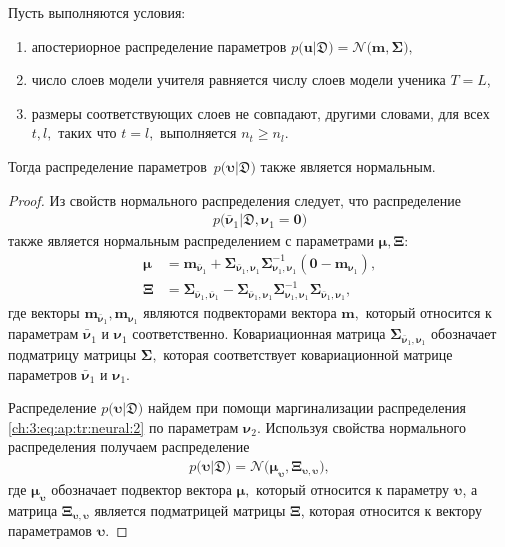 \begin{theorem}
\label{theorem:ap:neural}
Пусть выполняются условия:
\begin{enumerate}[1)]
\item апостериорное распределение параметров $p\bigr(\mathbf{u}|\mathfrak{D}\bigr) = \mathcal{N}\bigr(\mathbf{m}, \bm{\Sigma}\bigr),$
\item число слоев модели учителя равняется числу слоев модели ученика $T=L$,
\item размеры соответствующих слоев не совпадают, другими словами, для всех $t, l,$ таких что $t=l,$ выполняется $n_t \geq n_l.$
\end{enumerate}
Тогда распределение параметров~$p\bigr(\bm{\upsilon}|\mathfrak{D}\bigr)$ также является нормальным.
\end{theorem}
\begin{proof}
Из свойств нормального распределения следует, что распределение
\[
\label{ch:3:eq:ap:tr:neural:2}
\begin{aligned}
p\bigr(\bar{\bm{\nu}}_1|\mathfrak{D}, \bm{\nu}_1=\mathbf{0}\bigr)
\end{aligned}
\]
также является нормальным распределением с параметрами $\bm{\mu}, \bm{\Xi}$:
\[
\label{ch:3:eq:ap:tr:1:1}
\begin{aligned}
\bm{\mu} &= \mathbf{m}_{\bar{\bm{\nu}}_1}+\bm{\Sigma}_{\bar{\bm{\nu}}_1,\bm{\nu}_1} \bm{\Sigma}_{\bm{\nu}_1,\bm{\nu}_1}^{-1} \left(\mathbf{0} - \mathbf{m}_{\bm{\nu}_1}\right), \\
 \bm{\Xi} &= \bm{\Sigma}_{\bar{\bm{\nu}}_1,\bar{\bm{\nu}}_1} - \bm{\Sigma}_{\bar{\bm{\nu}}_1,\bm{\nu}_1} \bm{\Sigma}_{\bm{\nu}_1,\bm{\nu}_1}^{-1} \bm{\Sigma}_{\bar{\bm{\nu}}_1,\bm{\nu}_1},
\end{aligned}
\]
где векторы $\mathbf{m}_{\bar{\bm{\nu}}_1}, \mathbf{m}_{\bm{\nu}_1}$ являются подвекторами вектора $\mathbf{m},$ который относится к параметрам $\bar{\bm{\nu}}_1$ и $\bm{\nu}_1$ соответственно. Ковариационная матрица $\bm{\Sigma}_{\bar{\bm{\nu}}_1,\bm{\nu}_1}$ обозначает подматрицу матрицы $\bm{\Sigma},$ которая соответствует ковариационной матрице параметров $\bar{\bm{\nu}}_1$ и $\bm{\nu}_1.$

Распределение $p\bigr(\bm{\upsilon}|\mathfrak{D}\bigr)$ найдем при помощи маргинализации распределения \eqref{ch:3:eq:ap:tr:neural:2} по параметрам $\bm{\nu}_2.$ Используя свойства нормального распределения получаем распределение
\[
\label{ch:3:eq:ap:3}
\begin{aligned}
p\bigr(\bm{\upsilon}|\mathfrak{D}\bigr) = \mathcal{N}\bigr(\bm{\mu}_{\bm{\upsilon}},  \bm{\Xi}_{\bm{\upsilon}, \bm{\upsilon}}\bigr),
\end{aligned}
\]
где $\bm{\mu}_{\bm{\upsilon}}$ обозначает подвектор вектора $\bm{\mu},$ который относится к параметру $\bm{\upsilon}$, а матрица $\bm{\Xi}_{\bm{\upsilon}, \bm{\upsilon}}$ является подматрицей матрицы $\bm{\Xi}$, которая относится к вектору параметрамов $\bm{\upsilon}.$
\end{proof}

